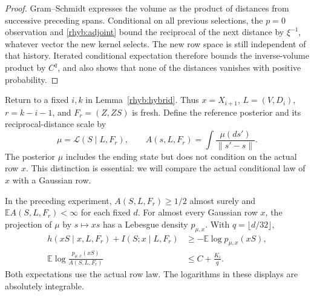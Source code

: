 \begin{proof}
Gram--Schmidt expresses the volume as the product of distances from
successive preceding spans.  Conditional on all previous selections,
the \(p=0\) observation and \eqref{rhyb:adjoint} bound the reciprocal of
the next distance by
\(\xi^{-1}\), whatever vector the new kernel selects.  The new row space
is still independent of that history.  Iterated conditional expectation
therefore bounds the inverse-volume product by \(C^q\), and also shows
that none of the distances vanishes with positive probability.
\end{proof}

Return to a fixed \(i,k\) in Lemma~\ref{rhyb:hybrid}.  Thus
\(x=X_{i+1}\), \(L=(V,D_i)\), \(r=k-i-1\), and \(F_r=(Z,ZS)\) is fresh.
Define the reference posterior and its reciprocal-distance scale by
\begin{equation}\label{rhyb:reciprocal-scale}
 \mu=\mathcal L(S\mid L,F_r),
 \qquad
 A(s,L,F_r)=\int\frac{\mu(ds')}{\|s'-s\|}.
\end{equation}
The posterior \(\mu\) includes the ending state but does not condition on
the actual row \(x\).  This distinction is essential: we will compare the
actual conditional law of \(x\) with a Gaussian row.

\begin{lemma}\label{rhyb:row-comparison}
In the preceding experiment, \(A(S,L,F_r)\ge1/2\) almost surely and
\(\mathbb E A(S,L,F_r)<\infty\) for each fixed \(d\).  For almost every
Gaussian row \(x\), the projection of \(\mu\) by \(s\mapsto xs\) has a
Lebesgue density \(p_{\mu,x}\).  With \(q=\lfloor d/32\rfloor\),
\begin{align}
 h(xS\mid x,L,F_r)+I(S;x\mid L,F_r)
 &\ge-\mathbb E\log p_{\mu,x}(xS),\label{rhyb:cross-entropy}\\
 \mathbb E\log\frac{p_{\mu,x}(xS)}{A(S,L,F_r)}
 &\le C+\frac{K_i}{q}.\label{rhyb:row-log-bound}
\end{align}
Both expectations use the actual row law.  The logarithms in these
displays are absolutely integrable.
\end{lemma}

